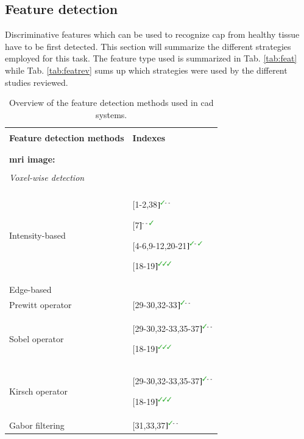 \subsection{Feature detection} \label{subsec:featuredetection}

Discriminative features which can be used to recognize \ac{cap} from healthy tissue have to be first detected. This section will summarize the different strategies employed for this task. The feature type used is summarized in Tab. \ref{tab:feat} while Tab. \ref{tab:featrev} sums up which strategies were used by the different studies reviewed.

\begin{table}
	\caption{Overview of the feature detection methods used in \ac{cad} systems.}
	\small
	\renewcommand{\arraystretch}{.9}
	\begin{tabular}{p{.5\linewidth} p{.4\linewidth}}
		\hline \\ [-1.5ex]
		\textbf{Feature detection methods} & \textbf{Indexes} \\ \\ [-1.5ex]
		\hline \\ [-1.5ex]
		\textbf{\ac{mri} image:} & \\ \\ [-1.5ex]
		\quad \textit{Voxel-wise detection} &  \\ \\ [-1.5ex]
		\quad \quad Intensity-based & $[$1-2,38$]^{\text{{\cmarksmall}- -}}$\par $[$7$]^{\text{- - {\cmarksmall}}}$\par $[$4-6,9-12,20-21$]^{\text{{\cmarksmall}- {\cmarksmall}}}$\par $[$18-19$]^{\text{{\cmarksmall}{\cmarksmall}{\cmarksmall}}}$ \\
		\quad \quad Edge-based & \\
		\quad \quad \quad Prewitt operator & $[$29-30,32-33$]^{\text{{\cmarksmall}- -}}$ \\
		\quad \quad \quad Sobel operator & $[$29-30,32-33,35-37$]^{\text{{\cmarksmall}- -}}$\par $[$18-19$]^{\text{{\cmarksmall}{\cmarksmall}{\cmarksmall}}}$ \\
		\quad \quad \quad Kirsch operator & $[$29-30,32-33,35-37$]^{\text{{\cmarksmall}- -}}$\par $[$18-19$]^{\text{{\cmarksmall}{\cmarksmall}{\cmarksmall}}}$ \\
		\quad \quad \quad Gabor filtering & $[$31,33,37$]^{\text{{\cmarksmall}- -}}$ \\ 

\end{tabular}
\end{table}
